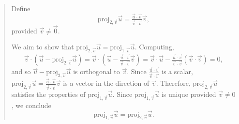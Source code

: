 \documentclass[letter]{article}
\newcommand{\Proj}{\mathrm{proj}}
\begin{document}
\begin{enumerate}
\begin{quote}
				Define 
				\[
					\Proj_{2,\vec v}\vec u = \tfrac{\vec u\cdot \vec v}{\vec v\cdot \vec v}\vec v,
				\]
				provided $\vec v\neq \vec 0$.
				
				We aim to show that $\Proj_{2,\vec v}\vec u=\Proj_{1,\vec v}\vec u$.  Computing,
				\[
					\vec v\cdot(\vec u-\Proj_{2,\vec v}\vec u)=
					\vec v\cdot\left(\vec u-\tfrac{\vec u\cdot \vec v}{\vec v\cdot \vec v}\vec v\right)
					=\vec v\cdot\vec u - \tfrac{\vec u\cdot \vec v}{\vec v\cdot \vec v}(\vec v\cdot\vec v)
					=0,
				\]
				and so $\vec u-\Proj_{2,\vec v}\vec u$ is orthogonal to $\vec v$.
				Since $\tfrac{\vec u\cdot \vec v}{\vec v\cdot \vec v}$ is a scalar,
				$\Proj_{2,\vec v}\vec u=\tfrac{\vec u\cdot \vec v}{\vec v\cdot \vec v}\vec v$
				is a vector in the direction of $\vec v$.  Therefore, $\Proj_{2,\vec v}\vec u$
				satisfies the properties of $\Proj_{1,\vec v}\vec u$.  Since $\Proj_{1,\vec v}\vec u$
				is unique provided $\vec v\neq 0$, we conclude
				\[
					\Proj_{1,\vec v}\vec u = \Proj_{2,\vec v}\vec u.
				\]
			\end{quote}


	\end{enumerate}
\end{document}
